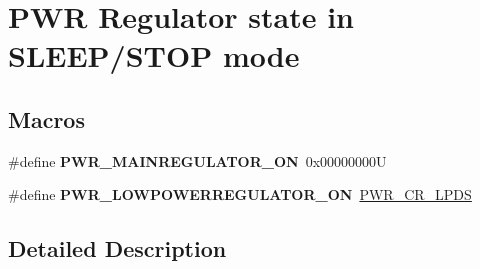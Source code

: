 \hypertarget{group___p_w_r___regulator__state__in___s_t_o_p__mode}{}\section{P\+WR Regulator state in S\+L\+E\+E\+P/\+S\+T\+OP mode}
\label{group___p_w_r___regulator__state__in___s_t_o_p__mode}
\subsection*{Macros}
\begin{DoxyCompactItemize}
\item 
\mbox{\label{group___p_w_r___regulator__state__in___s_t_o_p__mode_ga1d5b4e1482184286e28c16162f530039}} 
\#define {\bfseries P\+W\+R\+\_\+\+M\+A\+I\+N\+R\+E\+G\+U\+L\+A\+T\+O\+R\+\_\+\+ON}~0x00000000U
\item 
\mbox{\label{group___p_w_r___regulator__state__in___s_t_o_p__mode_gab9922a15f8414818d736d5e7fcace963}} 
\#define {\bfseries P\+W\+R\+\_\+\+L\+O\+W\+P\+O\+W\+E\+R\+R\+E\+G\+U\+L\+A\+T\+O\+R\+\_\+\+ON}~\mbox{\hyperlink{group___peripheral___registers___bits___definition_ga3aeb8d6f2539b0a3a4b851aeba0eea66}{P\+W\+R\+\_\+\+C\+R\+\_\+\+L\+P\+DS}}
\end{DoxyCompactItemize}


\subsection{Detailed Description}
